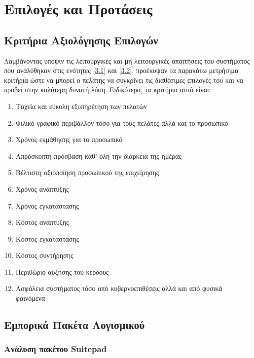 \chapter{Επιλογές και Προτάσεις}
\section{Κριτήρια Αξιολόγησης Επιλογών}
Λαμβάνοντας υπόψιν τις λειτουργικές και μη λειτουργικές απαιτήσεις του συστήματος που αναλύθηκαν στις ενότητες \ref{3.1} και \ref{3.2},
προέκυψαν τα παρακάτω μετρήσιμα κριτήρια ώστε να μπορεί ο πελάτης να συγκρίνει τις διαθέσιμες επιλογές του και να προβεί στην καλύτερη 
δυνατή λύση. Ειδικότερα, τα κριτήρια αυτά είναι:
\begin{enumerate}
	\item Ταχεία και εύκολη εξυπηρέτηση των πελατών
	\item  Φιλικό γραφικό περιβάλλον τόσο για τους πελάτες αλλά και το προσωπικό
	\item  Χρόνος εκμάθησης για το προσωπικό
	\item Απρόσκοπτη πρόσβαση καθ’ όλη την διάρκεια της ημέρας
	\item Βέλτιστη αξιοποίηση προσωπικού της επιχείρησης
	\item Χρόνος ανάπτυξης
	\item Χρόνος εγκατάστασης
	\item Κόστος ανάπτυξης
	\item Κόστος εγκατάστασης
	\item Κόστος συντήρησης
	\item Περιθώριο αύξησης του κέρδους
	\item Ασφάλεια συστήματος τόσο από κυβερνοεπιθέσεις αλλά και από φυσικά φαινόμενα
\end{enumerate}

\section{Εμπορικά Πακέτα Λογισμικού}
\subsection{Ανάλυση πακέτου Suitepad}
